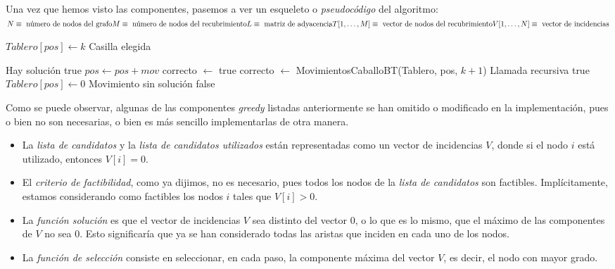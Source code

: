\documentclass[11pt]{article}
\begin{document}
Una vez que hemos visto las componentes, pasemos a ver un esqueleto o \textit{pseudocódigo} del algoritmo: \\
$N \equiv \text{ número de nodos del grafo}\\ M \equiv \text{ número de nodos del recubrimiento}\\ L \equiv \text{ matriz de adyacencia}\\ T[1,\dots,M] \equiv \text{ vector de nodos del recubrimiento}\\ V[1,\dots,N] \equiv \text{ vector de incidencias}$\\

\begin{algorithm}
\begin{algorithmic}

    \State $Tablero[pos] \gets k$ \Comment Casilla elegida
    
     \Comment Hay solución
    	\State \Return true
   	\EndIf
        \State $pos \gets pos + mov$
        \State correcto $\gets$ true
        	\State correcto $\gets$ MovimientosCaballoBT(Tablero, pos, $k+1$) \Comment 						Llamada recursiva
        		\State \Return true
        	\Else
        		\State $Tablero[pos] \gets 0$ \Comment Movimiento sin solución
        	\EndIf
        \EndIf
    \EndFor
    \State \Return false
\EndFunction
\end{algorithmic}
\end{algorithm}

Como se puede observar, algunas de las componentes \textit{greedy} listadas anteriormente se han omitido o modificado en la implementación, pues o bien no son necesarias, o bien es más sencillo implementarlas de otra manera.

\begin{itemize}
	\item La \textit{lista de candidatos} y la \textit{lista de candidatos utilizados} están representadas como un vector de incidencias $V$, donde si el nodo $i$ está utilizado, entonces $V[i] = 0$.
	\item El \textit{criterio de factibilidad}, como ya dijimos, no es necesario, pues todos los nodos de la \textit{lista de candidatos} son factibles. Implícitamente, estamos considerando como factibles los nodos $i$ tales que $V[i] > 0$.
	\item La \textit{función solución} es que el vector de incidencias $V$ sea distinto del vector $0$, o lo que es lo mismo, que el máximo de las componentes de $V$ no sea $0$. Esto significaría que ya se han considerado todas las aristas que inciden en cada uno de los nodos.
	\item La \textit{función de selección} consiste en seleccionar, en cada paso, la componente máxima del vector $V$, es decir, el nodo con mayor grado.
\end{itemize}
\end{document}

